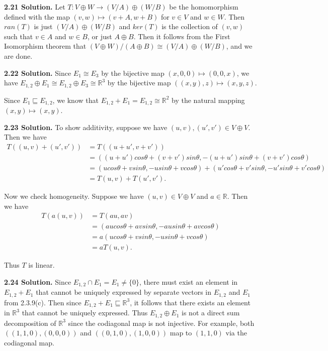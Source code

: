 \textbf{2.21 Solution.} Let $T:V \oplus W \to (V/A) \oplus (W/B)$ be the homomorphism defined with the map $(v,w) \mapsto (v+A, w+B)$ for $v \in V$ and $w \in W$. Then $ran(T)$ is just $(V/A) \oplus (W/B)$ and $ker(T)$ is the collection of $(v,w)$ such that $v \in A$ and $w \in B$, or just $A \oplus B$. Then it follows from the First Isomorphism theorem that $(V \oplus W)/(A \oplus B) \cong (V/A) \oplus (W/B)$, and we are done.

\textbf{2.22 Solution.} Since $E_1 \cong E_3$ by the bijective map $(x,0,0) \mapsto (0,0,x)$, we have $E_{1,2} \oplus E_1 \cong E_{1,2} \oplus E_3 \cong \mathbb{R}^3$ by the bijective map $((x,y),z) \mapsto (x,y,z)$.

Since $E_1 \sqsubseteq E_{1,2}$, we know that $E_{1,2} + E_1 = E_{1,2} \cong \mathbb{R}^2$ by the natural mapping $(x,y) \mapsto (x,y)$.

\textbf{2.23 Solution.} To show additivity, suppose we have $(u,v),(u',v')\in V\oplus V$. Then we have
\begin{align*}
    T((u,v)+(u',v')) &= T((u+u',v+v')) \\
                    &= ((u+u')cos\theta + (v+v')sin\theta, -(u+u')sin\theta + (v+v')cos\theta) \\
                    &= (ucos\theta + vsin\theta, -usin\theta + vcos\theta) + (u'cos\theta + v'sin\theta, -u'sin\theta + v'cos\theta) \\
                    &= T(u,v) + T(u',v').
\end{align*}

Now we check homogeneity. Suppose we have $(u,v)\in V\oplus V$ and $a\in\mathbb{R}$. Then we have
\begin{align*}
    T(a(u,v)) &= T(au,av) \\
              &= (aucos\theta + avsin\theta, -ausin\theta + avcos\theta) \\
              &= a(ucos\theta + vsin\theta, -usin\theta + vcos\theta) \\
              &= aT(u,v).
\end{align*}

Thus $T$ is linear.

\textbf{2.24 Solution.} Since $E_{1,2} \cap E_1 = E_1 \neq \{0\}$, there must exist an element in $E_{1,2}+E_1$ that cannot be uniquely expressed by separate vectors in $E_{1,2}$ and $E_1$ from 2.3.9(c). Then since $E_{1,2}+E_1 \sqsubseteq \mathbb{R}^3$, it follows that there exists an element in $\mathbb{R}^3$ that cannot be uniquely expressed. Thus $E_{1,2} \oplus E_1$ is not a direct sum decomposition of $\mathbb{R}^3$ since the codiagonal map is not injective. For example, both $((1,1,0),(0,0,0))$ and $((0,1,0),(1,0,0))$ map to $(1,1,0)$ via the codiagonal map.

